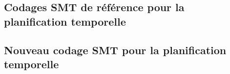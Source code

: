 

%
%
%







\subsection{Codages SMT de référence pour la planification temporelle}
%



\subsection{Nouveau codage SMT pour la planification temporelle}


